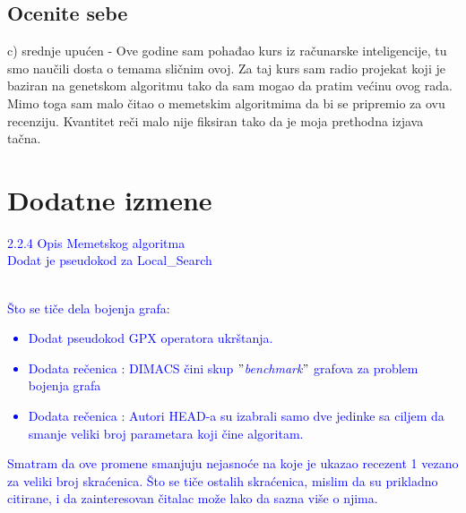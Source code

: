 \documentclass[a4paper]{report}
\newcommand{\odgovor}[1]{\textcolor{blue}{#1}}
\begin{document}
\section{Ocenite sebe}
c) srednje upućen
 - Ove godine sam pohađao kurs iz računarske inteligencije, tu smo naučili dosta o temama sličnim ovoj. Za taj kurs sam radio projekat koji je baziran na genetskom algoritmu tako da sam mogao da pratim većinu ovog rada. Mimo toga sam malo čitao o memetskim algoritmima da bi se pripremio za ovu recenziju. Kvantitet reči malo nije fiksiran tako da je moja prethodna izjava tačna.


\chapter{Dodatne izmene}

\odgovor{ 2.2.4 Opis Memetskog algoritma \\
Dodat je pseudokod za Local\_Search}
\\
\\
\odgovor{
Što se tiče dela bojenja grafa:
\begin{itemize}
\item Dodat pseudokod GPX operatora ukrštanja.
\item Dodata rečenica : DIMACS čini skup $"$\textit{benchmark}$"$ grafova za problem bojenja grafa
\item Dodata rečenica : Autori HEAD-a su izabrali samo dve jedinke sa ciljem da smanje veliki broj parametara koji čine algoritam.
\end{itemize}
Smatram da ove promene smanjuju nejasnoće na koje je ukazao recezent 1 vezano za veliki broj skraćenica. Što se tiče ostalih skraćenica, mislim da su prikladno citirane, i da zainteresovan čitalac može lako da sazna više o njima.
}
\end{document}
